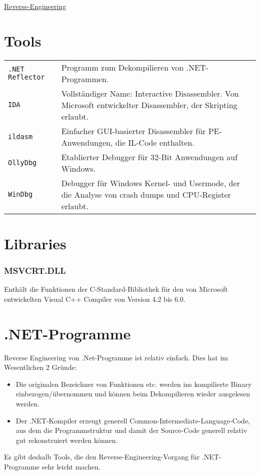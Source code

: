\raggedright
\footnotesize
\begin{multicols}{3}	
	\setlength{\premulticols}{1pt}
	\setlength{\postmulticols}{1pt}
	\setlength{\multicolsep}{1pt}
	\setlength{\columnsep}{2pt}

\begin{center}
     \Large{\underline{Reverse-Engineering}} \\
\end{center}

\section{Tools}
\begin{tabular}{@{}p{\the\MyLen}
	@{}p{\linewidth-\the\MyLen}@{}}
	\texttt{.NET Reflector} & Programm zum Dekompilieren von .NET-Programmen.\\
	\texttt{IDA} &  Vollständiger Name: Interactive Disassembler. Von Microsoft entwickelter Disassembler, der Skripting erlaubt. \\
	\texttt{ildasm} & Einfacher GUI-basierter Disassembler für PE-Anwendungen, die IL-Code enthalten.\\
	\texttt{OllyDbg} & Etablierter Debugger für 32-Bit Anwendungen auf Windows.\\
	\texttt{WinDbg} & Debugger für Windows Kernel- und Usermode, der die Analyse von crash dumps und CPU-Register erlaubt.\\
\end{tabular}
\section{Libraries}
\subsubsection{MSVCRT.DLL}
Enthält die Funktionen der C-Standard-Bibliothek für den von Microsoft entwickelten Visual C++ Compiler von Version 4.2 bis 6.0.
\section{.NET-Programme}
Reverse Engineering von .Net-Programme ist relativ einfach. Dies hat im Wesentlichen 2 Gründe:
\begin{itemize}
\item Die originalen Bezeichner von Funktionen etc. werden ins kompilierte Binary einbezogen/übernommen und können beim Dekompilieren wieder ausgelesen werden.
\item Der .NET-Kompiler erzeugt generell Common-Intermediate-Language-Code, aus dem die Programmstruktur und damit der Source-Code generell relativ gut rekonstruiert werden können.
\end{itemize}
Es gibt deshalb Tools, die den Reverse-Engineering-Vorgang für .NET-Programme sehr leicht machen.
\end{multicols}